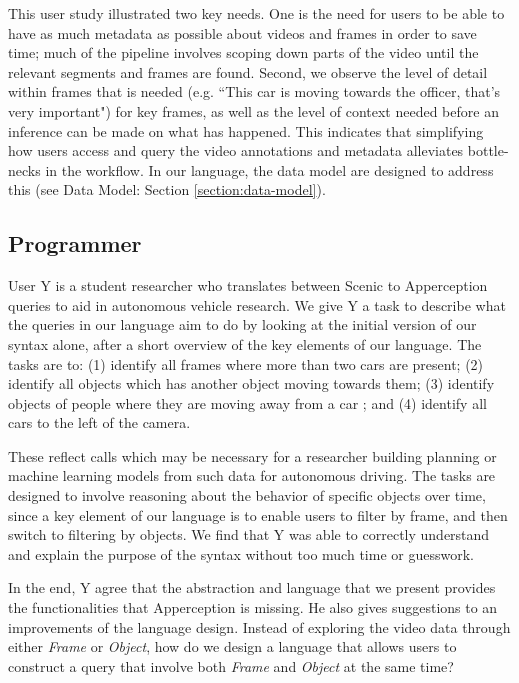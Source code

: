 This user study illustrated two key needs. One is the need for users to be able to have as much metadata as possible about videos and frames in order to save time; much of the pipeline involves scoping down parts of the video until the relevant segments and frames are found. Second, we observe the level of detail within frames that is needed (e.g. ``This car is moving towards the officer, that's very important") for key frames, as well as the level of context needed before an inference can be made on what has happened. This indicates that simplifying how users access and query the video annotations and metadata alleviates bottle-necks in the workflow. In our language, the data model are designed to address this (see Data Model: Section \ref{section:data-model}).




\subsection{Programmer}

User Y is a student researcher who translates between Scenic to Apperception queries to aid in autonomous vehicle research.
We give Y a task to describe what the queries in our language aim to do by looking at the initial version of our syntax alone, after a short overview of the key elements of our language.
The tasks are to: (1) identify all frames where more than two cars are present; (2) identify all objects which has another object moving towards them; (3) identify objects of people where they are moving away from a car ; and (4) identify all cars to the left of the camera.

These reflect calls which may be necessary for a researcher building planning or machine learning models from such data for autonomous driving. The tasks are designed to involve reasoning about the behavior of specific objects over time, since a key element of our language is to enable users to filter by frame, and then switch to filtering by objects.
We find that Y was able to correctly understand and explain the purpose of the syntax without too much time or guesswork.

In the end, Y agree that the abstraction and language that we present provides the functionalities that Apperception is missing.
He also gives suggestions to an improvements of the language design.
Instead of exploring the video data through either \emph{Frame} or \emph{Object},
how do we design a language that allows users to construct a query that involve both \emph{Frame} and \emph{Object} at the same time?

